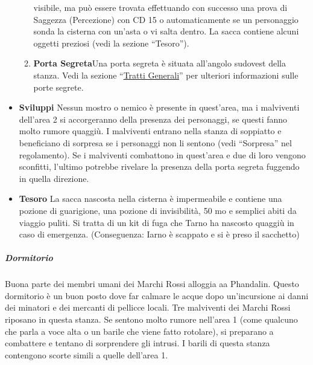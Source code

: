 \documentclass{article}
\begin{document}
\begin{itemize}
\begin{enumerate}
                        visibile, ma può essere trovata effettuando con successo una
                        prova di Saggezza (Percezione) con CD 15 o automaticamente
                        se un personaggio sonda la cisterna con un'asta o vi salta
                        dentro. La sacca contiene alcuni oggetti preziosi (vedi la
                        sezione “Tesoro”).
                        \item \textbf{Porta Segreta}Una porta segreta è situata all'angolo
                        sudovest della stanza. Vedi la sezione “\hyperlink{trattigen}{Tratti Generali}” per
                        ulteriori informazioni sulle porte segrete.
                                \end{enumerate}
                        \item \textbf{Sviluppi} Nessun mostro o nemico è presente in quest'area, ma
                        i malviventi dell’area 2 si accorgeranno della presenza
                        dei personaggi, se questi fanno molto rumore quaggiù. I
                        malviventi entrano nella stanza di soppiatto e beneficiano
                        di sorpresa se i personaggi non li sentono (vedi “Sorpresa”
                        nel regolamento). Se i malviventi combattono in quest'area
                        e due di loro vengono sconfitti, l’ultimo potrebbe rivelare la
                        presenza della porta segreta fuggendo in quella direzione.

                        \item \textbf{Tesoro} La sacca nascosta nella cisterna è impermeabile e contiene
                        una pozione di guarigione, una pozione di invisibilità, 50 mo
                        e semplici abiti da viaggio puliti. Si tratta di un kit di fuga che
                        Tarno ha nascosto quaggiù in caso di emergenza. (Conseguenza: Iarno è scappato e si è preso il sacchetto)
                        \end{itemize}
    
    \subparagraph{Dormitorio} 
        Buona parte dei membri umani dei Marchi Rossi alloggia
    aa Phandalin. Questo dormitorio è un buon posto dove far
    calmare le acque dopo un'incursione ai danni dei minatori e
    dei mercanti di pellicce locali. Tre malviventi dei Marchi Rossi riposano in questa stanza.
    Se sentono molto rumore nell’area 1 (come qualcuno che
    parla a voce alta o un barile che viene fatto rotolare), si
    preparano a combattere e tentano di sorprendere gli intrusi.
    I barili di questa stanza contengono scorte simili a
    quelle dell’area 1.
\end{document}
